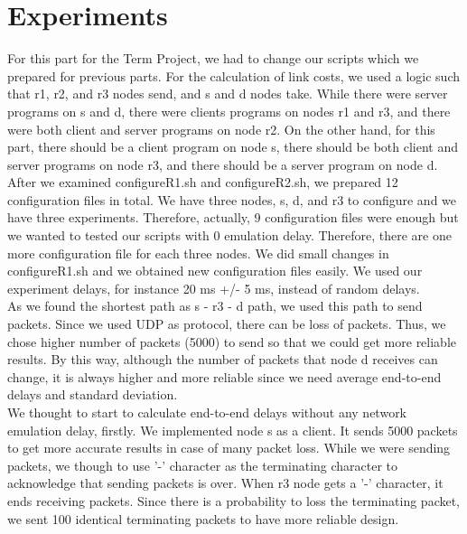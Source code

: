 \documentclass[conference]{IEEEtran}
\begin{document}
\section{Experiments}

For this part for the Term Project, we had to change our scripts which we prepared for previous parts. For the calculation of link costs, we used a logic such that r1, r2, and r3 nodes send, and s and d nodes take. While there were server programs on s and d, there were clients programs on nodes r1 and r3, and there were both client and server programs on node r2. On the other hand, for this part, there should be a client program on node s, there should be both client and server programs on node r3, and there should be a server program on node d.  \\

After we examined configureR1.sh and configureR2.sh, we prepared 12 configuration files in total. We have three nodes, s, d, and r3 to configure and we have three experiments. Therefore, actually, 9 configuration files were enough but we wanted to tested our scripts with 0 emulation delay. Therefore, there are one more configuration file for each three nodes. We did small changes in configureR1.sh and we obtained new configuration files easily. We used our experiment delays, for instance 20 ms +/- 5 ms, instead of random delays. \\

As we found the shortest path as s - r3 - d path, we used this path to send packets. Since we used UDP as protocol, there can be loss of packets. Thus, we chose higher number of packets (5000) to send so that we could get more reliable results. By this way, although the number of packets that node d receives can change, it is always higher and more reliable since we need average end-to-end delays and standard deviation. \\

We thought to start to calculate end-to-end delays without any network emulation delay, firstly. We implemented node s as a client. It sends 5000 packets to get more accurate results in case of many packet loss. While we were sending packets, we though to use '-' character as the terminating character to acknowledge that sending packets is over. When r3 node gets a '-' character, it ends receiving packets. Since there is a probability to loss the terminating packet, we sent 100 identical terminating packets to have more reliable design. \\
\end{document}
